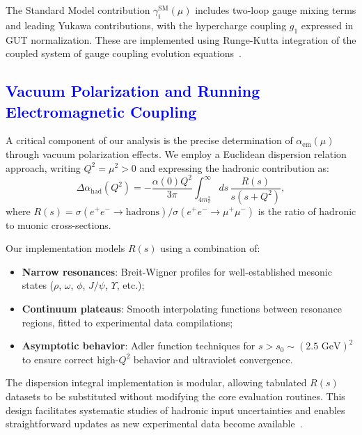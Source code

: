 \documentclass[%
amsmath,amssymb,
aps,
prb,
floatfix, showkeys, 10pt,
]{revtex4-2}
\newcommand{\modif}[1]{\textcolor{blue}{#1}}
\begin{document}
The Standard Model contribution $\gamma_i^{\text{SM}}(\mu)$ includes two-loop gauge mixing terms and leading Yukawa contributions, with the hypercharge coupling $g_1$ expressed in GUT normalization. These are implemented using Runge-Kutta integration of the coupled system of gauge coupling evolution equations~\cite{MachacekVaughn1983-85,Buttazzo2013}.















{\modif{  \subsection{Vacuum Polarization and Running Electromagnetic Coupling}
\label{subsec:vacuum_polarization}   }}
A critical component of our analysis is the precise determination of $\alpha_{\text{em}}(\mu)$ through vacuum polarization effects. We employ a Euclidean dispersion relation approach, writing $Q^2 = \mu^2 > 0$ and expressing the hadronic contribution as:
\begin{equation}
\Delta\alpha_{\text{had}}(Q^2) = -\frac{\alpha(0) Q^2}{3\pi} \int_{4m_\pi^2}^{\infty} ds \, \frac{R(s)}{s(s + Q^2)},
\label{eq:hadronic_vpol}
\end{equation}
where $R(s) = \sigma(e^+e^- \to \text{hadrons})/\sigma(e^+e^- \to \mu^+\mu^-)$ is the ratio of hadronic to muonic cross-sections.

Our implementation models $R(s)$ using a combination of:
\begin{itemize}
\item \textbf{Narrow resonances}: Breit-Wigner profiles for well-established mesonic states ($\rho$, $\omega$, $\phi$, $J/\psi$, $\Upsilon$, etc.);

\item \textbf{Continuum plateaus}: Smooth interpolating functions between resonance regions, fitted to experimental data compilations;

\item \textbf{Asymptotic behavior}: Adler function techniques for $s > s_0 \sim (2.5 \text{ GeV})^2$ to ensure correct high-$Q^2$ behavior and ultraviolet convergence.
\end{itemize}

The dispersion integral implementation is modular, allowing tabulated $R(s)$ datasets to be substituted without modifying the core evaluation routines. This design facilitates systematic studies of hadronic input uncertainties and enables straightforward updates as new experimental data become available~\cite{EidelmanJegerlehner1995,Jegerlehner2003,Keshavarzi2019,Davier2017}.
\end{document}
